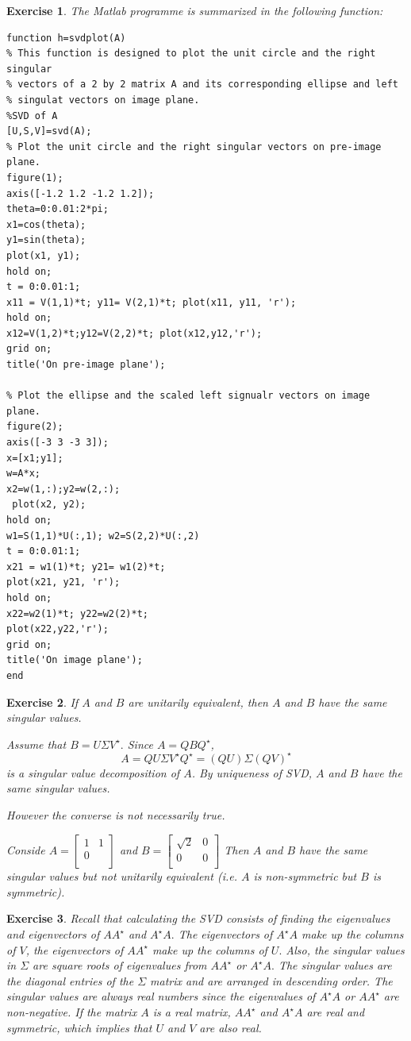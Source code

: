 \documentclass[paper=a4, fontsize=11pt]{scrartcl} %
\numberwithin{equation}{section} %
\numberwithin{figure}{section} %
\numberwithin{table}{section} %
\newtheorem{exercise}{Exercise}
\numberwithin{exercise}{section}
\begin{document}
\begin{exercise}
The Matlab programme is summarized in the following function:

  \begin{verbatim}
function h=svdplot(A)
% This function is designed to plot the unit circle and the right singular
% vectors of a 2 by 2 matrix A and its corresponding ellipse and left
% singulat vectors on image plane.
%SVD of A
[U,S,V]=svd(A);
% Plot the unit circle and the right singular vectors on pre-image plane.
figure(1);
axis([-1.2 1.2 -1.2 1.2]);
theta=0:0.01:2*pi;
x1=cos(theta);
y1=sin(theta);
plot(x1, y1);
hold on;
t = 0:0.01:1;
x11 = V(1,1)*t; y11= V(2,1)*t; plot(x11, y11, 'r');
hold on;
x12=V(1,2)*t;y12=V(2,2)*t; plot(x12,y12,'r');
grid on;
title('On pre-image plane');

% Plot the ellipse and the scaled left signualr vectors on image plane.
figure(2);
axis([-3 3 -3 3]);
x=[x1;y1];
w=A*x;
x2=w(1,:);y2=w(2,:);
 plot(x2, y2);
hold on;
w1=S(1,1)*U(:,1); w2=S(2,2)*U(:,2)
t = 0:0.01:1;
x21 = w1(1)*t; y21= w1(2)*t;
plot(x21, y21, 'r');
hold on;
x22=w2(1)*t; y22=w2(2)*t;
plot(x22,y22,'r');
grid on;
title('On image plane');
end
\end{verbatim}\color{black}
\end{exercise}
\begin{exercise}
If $A$ and $B$ are unitarily equivalent, then $A$ and $B$ have the same singular values.

Assume that $B=U\Sigma V^{\star}.$ Since $A=QBQ^{\star}$, 
$$A=QU\Sigma V^{\star} Q^{\star}=(QU)\Sigma (QV)^{\star}$$
is a singular value decomposition of $A$. By uniqueness of SVD, $A$ and $B$ have the same singular values. 


However the converse is not necessarily true.

Conside $A=\begin{bmatrix}
 1 & 1\\
 0 & \\
\end{bmatrix}$ and $B=\begin{bmatrix}
 \sqrt{2} & 0\\
 0 & 0 \\
\end{bmatrix}$
Then $A$ and $B$ have the same singular values but  not unitarily equivalent (i.e. $A$ is non-symmetric but $B$ is symmetric).
\end{exercise}
\begin{exercise}
Recall that calculating the SVD consists of finding the eigenvalues and eigenvectors of $AA^{\star}$ and $A^{\star}A.$ The eigenvectors of $A^{\star} A$ make up the columns of $V$, the eigenvectors of $AA^{\star}$  make up the columns of $U.$ Also, the singular values in $\Sigma$ are square roots of eigenvalues from $AA^{\star}$ or $A^{\star}A.$  The singular values are the diagonal entries of the $\Sigma$ matrix and are arranged in descending order. The singular values are always real numbers since the eigenvalues of $A^{\star} A$ or $AA^{\star}$ are non-negative. If the matrix $A$ is a real matrix, $AA^{\star}$ and $A^{\star}A$ are real and symmetric, which implies that  $U$ and $V$ are also real.
\end{exercise}
\end{document}
